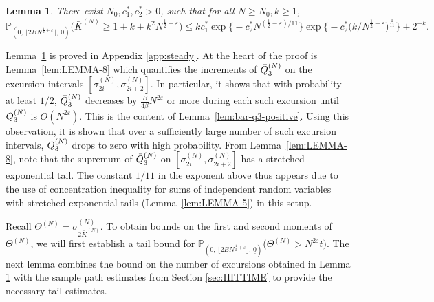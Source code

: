 \documentclass[11pt, reqno]{article}
\newtheorem{lemma}[theorem]{Lemma}
\numberwithin{equation}{section}
\numberwithin{theorem}{section}
\newcommand\blue[1]{#1}
\begin{document}
\begin{lemma}\label{lem:LEMMA-5.1}
There exist $ N_0, c^*_1,c^*_2>0$, such that for all $N\geq N_0,k\geq 1$,
\begin{equation*}
    \mathbb{P}_{(0, \, \lfloor 2BN^{\frac{1}{2}+\varepsilon} \rfloor, \,\underline{0})}\big(\bar{K}^{(N)}\geq 1+k+k^2N^{\frac{1}{2}-\varepsilon}\big)\leq kc^*_1\exp \big\{-c^*_2N^{(\frac{1}{2}-\varepsilon)/11}\big\}\exp \Big\{-c^*_2\big(k/N^{\frac{1}{2}-\varepsilon}\big)^{\frac{1}{11}}\Big\}+2^{-k}.
\end{equation*}
\end{lemma}
Lemma~\ref{lem:LEMMA-5.1} is proved in Appendix \ref{app:steady}. \blue{At the heart of the proof is Lemma~\ref{lem:LEMMA-8} which quantifies the increments of $\Bar{Q}^{(N)}_3$ on the excursion intervals $[\sigma_{2i}^{(N)},\sigma_{2i+2}^{(N)}]$. In particular, it shows that with probability at least $1/2$, $\Bar{Q}^{(N)}_3$ decreases by $\frac{B}{4\beta}N^{2\varepsilon}$ or more during each such excursion until $\Bar{Q}^{(N)}_3$ is $O(N^{2\varepsilon})$. This is the content of Lemma~\ref{lem:bar-q3-positive}. Using this observation, it is shown that over a sufficiently large number of such excursion intervals, $\Bar{Q}^{(N)}_3$ drops to zero with high probability.}
\blue{From Lemma~\ref{lem:LEMMA-8}, note that the supremum of $\Bar{Q}^{(N)}_3$ on $[\sigma_{2i}^{(N)},\sigma_{2i+2}^{(N)}]$ has a stretched-exponential tail.
The constant $1/11$ in the exponent above thus appears due to the use of concentration inequality for sums of independent random variables with stretched-exponential tails (Lemma~\ref{lem:LEMMA-5}) in this setup.}

Recall $\Theta^{(N)} = \sigma^{(N)}_{2\bar{K}^{(N)}}$. 
To obtain bounds on the first and second moments of $\Theta^{(N)}$, we will first establish a tail bound for $\mathbb{P}_{(0, \, \lfloor 2BN^{\frac{1}{2}+\varepsilon} \rfloor, \,\underline{0})}\big(\Theta^{(N)} >N^{2\varepsilon}t\big)$.
The next lemma combines the bound on the number of excursions obtained in Lemma \ref{lem:LEMMA-5.1} with the sample path estimates from Section \ref{sec:HITTIME} to provide the necessary tail estimates.
\end{document}
